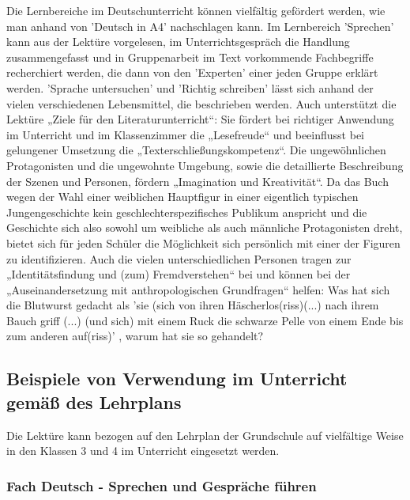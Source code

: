 Die Lernbereiche im Deutschunterricht können vielfältig gefördert werden, wie man anhand von 'Deutsch in A4' \cite[]{DIN A4} nachschlagen kann. Im Lernbereich 'Sprechen'  kann aus der Lektüre vorgelesen, im Unterrichtsgespräch die Handlung zusammengefasst und in Gruppenarbeit im Text vorkommende Fachbegriffe recherchiert werden, die dann von den 'Experten' einer jeden Gruppe erklärt werden. 'Sprache untersuchen' und 'Richtig schreiben' lässt sich anhand der vielen verschiedenen Lebensmittel, die beschrieben werden. Auch unterstützt die Lektüre „Ziele für den Literaturunterricht“: Sie fördert bei richtiger Anwendung im Unterricht und im Klassenzimmer die „Lesefreude“ und beeinflusst bei gelungener Umsetzung die „Texterschließungskompetenz“. Die ungewöhnlichen Protagonisten und die ungewohnte Umgebung, sowie die detaillierte Beschreibung der Szenen und Personen, fördern „Imagination und Kreativität“. Da das Buch wegen der Wahl einer weiblichen Hauptfigur in einer eigentlich typischen Jungengeschichte kein geschlechterspezifisches Publikum anspricht und die Geschichte sich also sowohl um weibliche als auch männliche Protagonisten dreht, bietet sich für jeden Schüler die Möglichkeit sich persönlich mit einer der Figuren zu identifizieren. Auch die vielen unterschiedlichen Personen tragen zur „Identitätsfindung und (zum) Fremdverstehen“ bei und können bei der „Auseinandersetzung mit anthropologischen Grundfragen“ helfen: Was hat sich die Blutwurst gedacht  als 'sie (sich von ihren Häscherlos(riss)(...) nach ihrem Bauch griff (...) (und sich) mit einem Ruck die schwarze Pelle von einem Ende bis zum anderen auf(riss)' \cite[S.229]{pir},  warum hat sie so gehandelt?



\subsection{Beispiele von Verwendung im Unterricht gemäß des Lehrplans}

Die Lektüre kann bezogen auf den Lehrplan der Grundschule\cite[]{LP GS 2000}  auf vielfältige Weise in den Klassen 3 und 4 im Unterricht eingesetzt werden. 

\subsubsection{Fach Deutsch - Sprechen und Gespräche führen}

